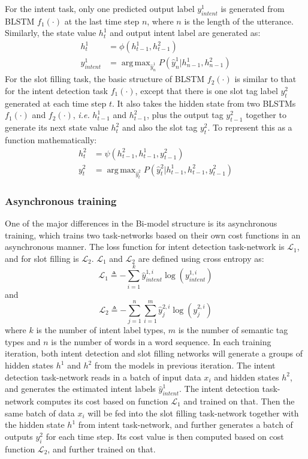 \documentclass[11pt,a4paper]{article}
\DeclareMathOperator*{\argmax}{arg\,max}
\begin{document}
For the intent task, only one predicted output label $y_{intent}^1$ is generated from BLSTM $f_1(\cdot)$ at the last time step $n$, where $n$ is the length of the utterance. Similarly, the state value $h_t^1$ and output intent label are generated as:
\begin{equation}
\begin{split}
h^1_t&=\phi(h^1_{t-1},h^2_{t-1})\\
y_{intent}^1&=\argmax_{\hat{y}_n^{1}} P(\hat{y}_n^{1}|h^1_{n-1},h^2_{n-1})
\end{split}
\end{equation}
For the slot filling task, the basic structure of BLSTM $f_2(\cdot)$ is similar to that for the intent detection task $f_1(\cdot)$, except that there is one slot tag label $y_t^2$ generated at each time step $t$. It also takes the hidden state from two BLSTMs $f_1(\cdot)$ and $f_2(\cdot)$, \emph{i.e.} $h_{t-1}^1$ and $h_{t-1}^2$, plus the output tag $y_{t-1}^2$ together to generate its next state value $h_t^2$ and also the slot tag $y_{t}^2$. To represent this as a function mathematically:
\begin{equation}
\begin{split}
h^2_t&=\psi(h^2_{t-1},h^1_{t-1},y_{t-1}^2)\\
y_t^2&=\argmax_{\hat{y}_t^{2}} P(\hat{y}_t^{2}|h^1_{t-1},h^2_{t-1},y_{t-1}^2)
\end{split}
\end{equation}
\subsubsection{Asynchronous training}
One of the major differences in the Bi-model structure is its asynchronous training, which trains two task-networks based on their own cost functions in an asynchronous manner. The loss function for intent detection task-network is $\mathcal{L}_1$, and for slot filling is $\mathcal{L}_2$. $\mathcal{L}_1$ and $\mathcal{L}_2$ are defined using cross entropy as:
\begin{equation}
\mathcal{L}_1\triangleq-\sum_{i=1}^k\hat{y}_{intent}^{1,i}\log(y_{intent}^{1,i})
\end{equation}
and 
\begin{equation}
\mathcal{L}_2\triangleq-\sum_{j=1}^n\sum_{i=1}^m\hat{y}_{j}^{2,i}\log(y_{j}^{2,i})
\end{equation}
where $k$ is the number of intent label types, $m$ is the number of semantic tag types and $n$ is the number of words in a word sequence.
In each training iteration, both intent detection and slot filling networks will generate a groups of hidden states $h^1$ and $h^2$ from the models in previous iteration. The intent detection task-network reads in a batch of input data $x_i$ and hidden states $h^2$, and generates the estimated intent labels $\hat{y}_{intent}^{1}$. The intent detection task-network computes its cost based on function $\mathcal{L}_1$ and trained on that. Then the same batch of data $x_i$ will be fed into the slot filling task-network together with the hidden state $h^1$ from intent task-network, and further generates a batch of outputs $y_i^2$ for each time step. Its cost value is then computed based on cost function $\mathcal{L}_2$, and further trained on that.
\end{document}

